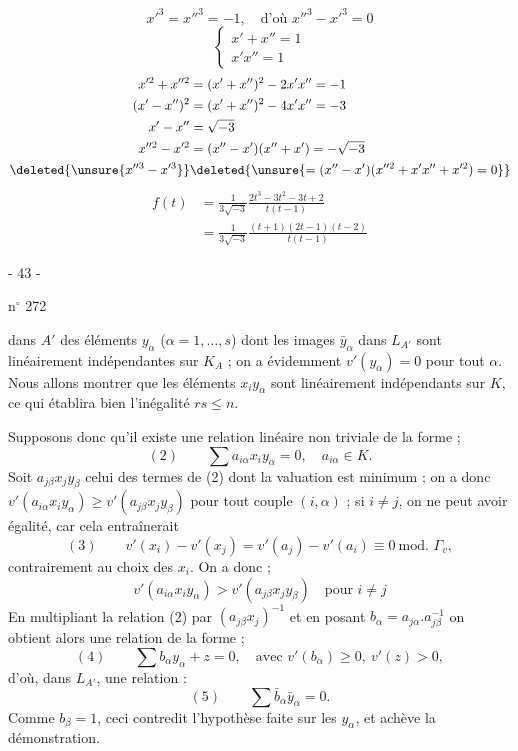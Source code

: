 \[
x'^3=x''^3=-1,\quad\text{d'où }x''^3-x'^3=0
\]
\[
\left\{\begin{array}{l}x'+x''=1\\x'x''=1\end{array}\right.
\]
\[
\begin{aligned}
x'^2+x''^2&=(x'+x'')^2-2x'x''=-1\\
(x'-x'')^2&=(x'+x'')^2-4x'x''=-3\\
x'-x''&=\sqrt{-3}\\
x''^2-x'^2&=(x''-x')(x''+x')=-\sqrt{-3}\\
\deleted{\unsure{x''^3-x'^3}}&\deleted{\unsure{=(x''-x')(x''^2+x'x''+x'^2)=0}}
\end{aligned}
\]
\[
\begin{aligned}
f(t)&=\frac1{3\sqrt{-3}}\frac{2t^3-3t^2-3t+2}{t(t-1)}\\
&=\frac1{3\sqrt{-3}}\frac{(t+1)(2t-1)(t-2)}{t(t-1)}
\end{aligned}
\]

\begin{center}- 43 -\end{center}
\hfill n$^\circ$ 272

dans $A'$ des éléments $y_\alpha$ ($\alpha=1,\ldots,s$) dont les images $\bar y_\alpha$ dans $L_{A'}$ sont linéairement indépendantes sur $K_A$ ; on a évidemment $v'(y_\alpha)=0$ pour tout $\alpha$. Nous allons montrer que les éléments $x_i y_\alpha$ sont linéairement indépendants sur $K$, ce qui établira bien l'inégalité $rs\leqslant n$.

Supposons donc qu'il existe une relation linéaire non triviale de la forme ;
\[
(2)\qquad \sum a_{i\alpha}x_i y_\alpha=0,\quad a_{i\alpha}\in K.
\]
Soit $a_{j\beta}x_j y_\beta$ celui des termes de (2) dont la valuation est minimum ; on a donc $v'(a_{i\alpha}x_i y_\alpha)\geqslant v'(a_{j\beta}x_j y_\beta)$ pour tout couple $(i,\alpha)$ ; si $i\ne j$, on ne peut avoir égalité, car cela entraînerait
\[
(3)\qquad v'(x_i)-v'(x_j)=v'(a_j)-v'(a_i)\equiv0\ \text{mod. }\Gamma_v,
\]
contrairement au choix des $x_i$. On a donc ;
\[
v'(a_{i\alpha}x_i y_\alpha)>v'(a_{j\beta}x_j y_\beta)\quad\text{pour }i\ne j
\]
En multipliant la relation (2) par $(a_{j\beta}x_j)^{-1}$ et en posant $b_\alpha=a_{j\alpha}.a_{j\beta}^{-1}$ on obtient alors une relation de la forme ;
\[
(4)\qquad \sum b_\alpha y_\alpha+z=0,\quad\text{avec }v'(b_\alpha)\geqslant0,\ v'(z)>0,
\]
d'où, dans $L_{A'}$, une relation :
\[
(5)\qquad\sum\bar b_\alpha\bar y_\alpha=0.
\]
Comme $b_\beta=1$, ceci contredit l'hypothèse faite sur les $y_\alpha$, et achève la démonstration.

